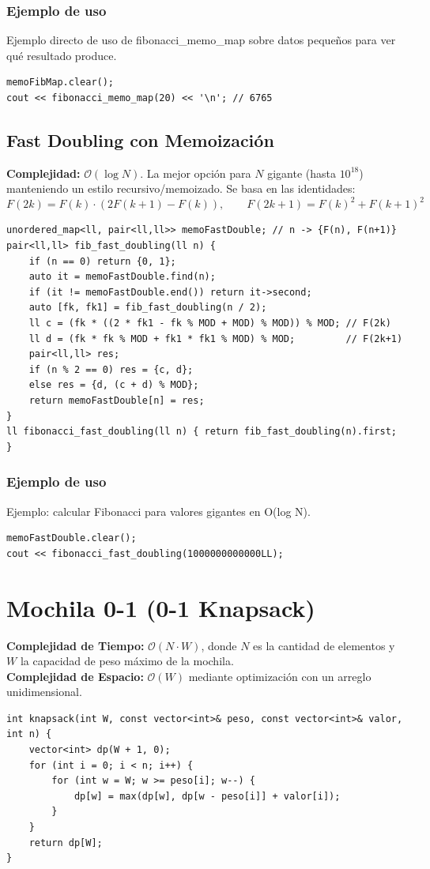 \documentclass[10pt,twocolumn,letterpaper]{report}
\begin{document}
\subsubsection*{Ejemplo de uso}
Ejemplo directo de uso de fibonacci\_memo\_map sobre datos pequeños para ver qué resultado produce.
\begin{lstlisting}
memoFibMap.clear();
cout << fibonacci_memo_map(20) << '\n'; // 6765
\end{lstlisting}


\subsection{Fast Doubling con Memoización}
\textbf{Complejidad:} $\mathcal{O}(\log N)$. La mejor opción para $N$ gigante (hasta $10^{18}$) manteniendo un estilo recursivo/memoizado. Se basa en las identidades:
\[
F(2k) = F(k)\cdot(2F(k+1)-F(k)), \qquad F(2k+1) = F(k)^2 + F(k+1)^2
\]
\begin{lstlisting}
unordered_map<ll, pair<ll,ll>> memoFastDouble; // n -> {F(n), F(n+1)}
pair<ll,ll> fib_fast_doubling(ll n) {
    if (n == 0) return {0, 1};
    auto it = memoFastDouble.find(n);
    if (it != memoFastDouble.end()) return it->second;
    auto [fk, fk1] = fib_fast_doubling(n / 2);
    ll c = (fk * ((2 * fk1 - fk % MOD + MOD) % MOD)) % MOD; // F(2k)
    ll d = (fk * fk % MOD + fk1 * fk1 % MOD) % MOD;         // F(2k+1)
    pair<ll,ll> res;
    if (n % 2 == 0) res = {c, d};
    else res = {d, (c + d) % MOD};
    return memoFastDouble[n] = res;
}
ll fibonacci_fast_doubling(ll n) { return fib_fast_doubling(n).first; }
\end{lstlisting}
\subsubsection*{Ejemplo de uso}
Ejemplo: calcular Fibonacci para valores gigantes en O(log N).
\begin{lstlisting}
memoFastDouble.clear();
cout << fibonacci_fast_doubling(1000000000000LL);
\end{lstlisting}


\section{Mochila 0-1 (0-1 Knapsack)}
\textbf{Complejidad de Tiempo:} $\mathcal{O}(N \cdot W)$, donde $N$ es la cantidad de elementos y $W$ la capacidad de peso máximo de la mochila. \\
\textbf{Complejidad de Espacio:} $\mathcal{O}(W)$ mediante optimización con un arreglo unidimensional.
\begin{lstlisting}
int knapsack(int W, const vector<int>& peso, const vector<int>& valor, int n) {
    vector<int> dp(W + 1, 0);
    for (int i = 0; i < n; i++) {
        for (int w = W; w >= peso[i]; w--) {
            dp[w] = max(dp[w], dp[w - peso[i]] + valor[i]);
        }
    }
    return dp[W];
}
\end{lstlisting}
\end{document}
